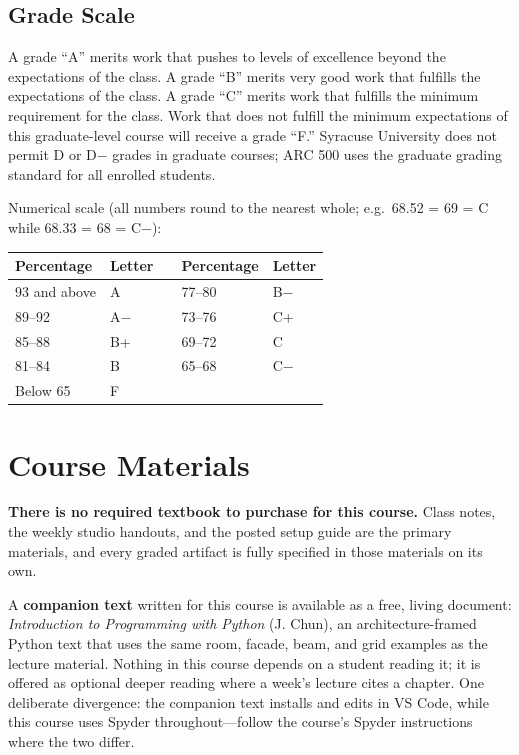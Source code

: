 \documentclass[11pt]{article}
\begin{document}
\subsection{Grade Scale}

A grade ``A'' merits work that pushes to levels of excellence beyond the expectations of the
class. A grade ``B'' merits very good work that fulfills the expectations of the class. A
grade ``C'' merits work that fulfills the minimum requirement for the class. Work that does
not fulfill the minimum expectations of this graduate-level course will receive a grade
``F.'' Syracuse University does not permit D or D$-$ grades in graduate courses; ARC 500 uses
the graduate grading standard for all enrolled students.

Numerical scale (all numbers round to the nearest whole; e.g.\ 68.52 = 69 = C while 68.33 = 68
= C$-$):

\begin{center}
\begin{tabular}{@{}llcll@{}}
\toprule
\textbf{Percentage} & \textbf{Letter} & \hspace{1.5em} & \textbf{Percentage} & \textbf{Letter} \\
\midrule
93 and above & A    & & 77--80 & B$-$ \\
89--92 & A$-$ & & 73--76 & C+  \\
85--88 & B+   & & 69--72 & C   \\
81--84 & B    & & 65--68 & C$-$ \\
Below 65 & F & & & \\
\bottomrule
\end{tabular}
\end{center}

\section{Course Materials}

\textbf{There is no required textbook to purchase for this course.} Class notes, the weekly
studio handouts, and the posted setup guide are the primary materials, and every graded
artifact is fully specified in those materials on its own.

A \textbf{companion text} written for this course is available as a free, living document:
\emph{Introduction to Programming with Python} (J. Chun), an architecture-framed Python text
that uses the same room, facade, beam, and grid examples as the lecture material. Nothing in
this course depends on a student reading it; it is offered as optional deeper reading where a
week's lecture cites a chapter. One deliberate divergence: the companion text installs and
edits in VS Code, while this course uses Spyder throughout---follow the course's Spyder
instructions where the two differ.
\end{document}
